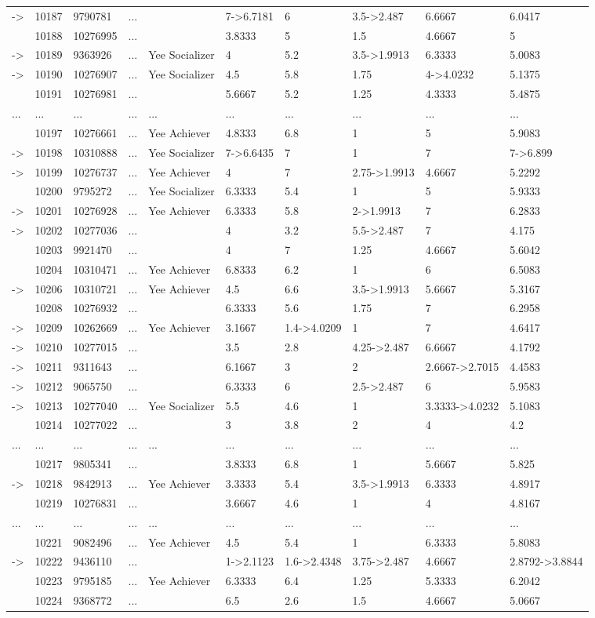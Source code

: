 \documentclass[6pt,a4paper]{article}
\begin{document}
\begin{landscape}
{\begin{longtable}{llllllllll}
-\textgreater &10187&9790781&...&&7-\textgreater 6.7181&6&3.5-\textgreater 2.487&6.6667&6.0417\tabularnewline
&10188&10276995&...&&3.8333&5&1.5&4.6667&5\tabularnewline
-\textgreater &10189&9363926&...&Yee Socializer&4&5.2&3.5-\textgreater 1.9913&6.3333&5.0083\tabularnewline
-\textgreater &10190&10276907&...&Yee Socializer&4.5&5.8&1.75&4-\textgreater 4.0232&5.1375\tabularnewline
&10191&10276981&...&&5.6667&5.2&1.25&4.3333&5.4875\tabularnewline
...&...&...&...&...&...&...&...&...&...\tabularnewline
&10197&10276661&...&Yee Achiever&4.8333&6.8&1&5&5.9083\tabularnewline
-\textgreater &10198&10310888&...&Yee Socializer&7-\textgreater 6.6435&7&1&7&7-\textgreater 6.899\tabularnewline
-\textgreater &10199&10276737&...&Yee Achiever&4&7&2.75-\textgreater 1.9913&4.6667&5.2292\tabularnewline
&10200&9795272&...&Yee Socializer&6.3333&5.4&1&5&5.9333\tabularnewline
-\textgreater &10201&10276928&...&Yee Achiever&6.3333&5.8&2-\textgreater 1.9913&7&6.2833\tabularnewline
-\textgreater &10202&10277036&...&&4&3.2&5.5-\textgreater 2.487&7&4.175\tabularnewline
&10203&9921470&...&&4&7&1.25&4.6667&5.6042\tabularnewline
&10204&10310471&...&Yee Achiever&6.8333&6.2&1&6&6.5083\tabularnewline
-\textgreater &10206&10310721&...&Yee Achiever&4.5&6.6&3.5-\textgreater 1.9913&5.6667&5.3167\tabularnewline
&10208&10276932&...&&6.3333&5.6&1.75&7&6.2958\tabularnewline
-\textgreater &10209&10262669&...&Yee Achiever&3.1667&1.4-\textgreater 4.0209&1&7&4.6417\tabularnewline
-\textgreater &10210&10277015&...&&3.5&2.8&4.25-\textgreater 2.487&6.6667&4.1792\tabularnewline
-\textgreater &10211&9311643&...&&6.1667&3&2&2.6667-\textgreater 2.7015&4.4583\tabularnewline
-\textgreater &10212&9065750&...&&6.3333&6&2.5-\textgreater 2.487&6&5.9583\tabularnewline
-\textgreater &10213&10277040&...&Yee Socializer&5.5&4.6&1&3.3333-\textgreater 4.0232&5.1083\tabularnewline
&10214&10277022&...&&3&3.8&2&4&4.2\tabularnewline
...&...&...&...&...&...&...&...&...&...\tabularnewline
&10217&9805341&...&&3.8333&6.8&1&5.6667&5.825\tabularnewline
-\textgreater &10218&9842913&...&Yee Achiever&3.3333&5.4&3.5-\textgreater 1.9913&6.3333&4.8917\tabularnewline
&10219&10276831&...&&3.6667&4.6&1&4&4.8167\tabularnewline
...&...&...&...&...&...&...&...&...&...\tabularnewline
&10221&9082496&...&Yee Achiever&4.5&5.4&1&6.3333&5.8083\tabularnewline
\newpage
-\textgreater &10222&9436110&...&&1-\textgreater 2.1123&1.6-\textgreater 2.4348&3.75-\textgreater 2.487&4.6667&2.8792-\textgreater 3.8844\tabularnewline
&10223&9795185&...&Yee Achiever&6.3333&6.4&1.25&5.3333&6.2042\tabularnewline
&10224&9368772&...&&6.5&2.6&1.5&4.6667&5.0667\tabularnewline

\end{longtable}}
\end{landscape}
\end{document}
